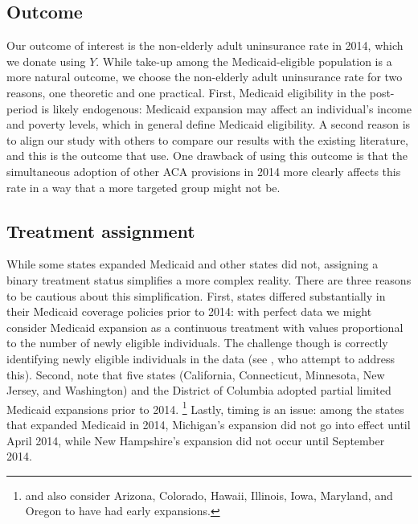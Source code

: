 \documentclass[12pt]{article}
\begin{document}
\subsection{Outcome}

Our outcome of interest is the non-elderly adult uninsurance rate in 2014, which we donate using $Y$. While take-up among the Medicaid-eligible population is a more natural outcome, we choose the non-elderly adult uninsurance rate for two reasons, one theoretic and one practical. First, Medicaid eligibility in the post-period is likely endogenous: Medicaid expansion may affect an individual's income and poverty levels, which in general define Medicaid eligibility. A second reason is to align our study with others to compare our results with the existing literature, and this is the outcome that \cite{courtemanche2017early} use. One drawback of using this outcome is that the simultaneous adoption of other ACA provisions in 2014 more clearly affects this rate in a way that a more targeted group might not be.

\subsection{Treatment assignment} \label{sssec:txassign}

While some states expanded Medicaid and other states did not, assigning a binary treatment status simplifies a more complex reality. There are three reasons to be cautious about this simplification. First, states differed substantially in their Medicaid coverage policies prior to 2014: with perfect data we might consider Medicaid expansion as a continuous treatment with values proportional to the number of newly eligible individuals. The challenge though is correctly identifying newly eligible individuals in the data (see \cite{frean2017premium}, who attempt to address this). Second, \cite{frean2017premium} note that five states (California, Connecticut, Minnesota, New Jersey, and Washington) and the District of Columbia adopted partial limited Medicaid expansions prior to 2014. \footnote{\cite{kaestner2017effects} and \cite{courtemanche2017early} also consider Arizona, Colorado, Hawaii, Illinois, Iowa, Maryland, and Oregon to have had early expansions.} Lastly, timing is an issue: among the states that expanded Medicaid in 2014, Michigan's expansion did not go into effect until April 2014, while New Hampshire's expansion did not occur until September 2014.
\end{document}
